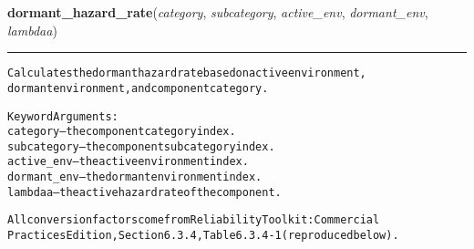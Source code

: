 \begin{boxedminipage}{\funcwidth}
\setlength{\parskip}{1ex}
    \end{boxedminipage}

    \label{reliafree:calculations:dormant_hazard_rate}

    \vspace{0.5ex}

\hspace{.8\funcindent}\begin{boxedminipage}{\funcwidth}

    \raggedright \textbf{dormant\_hazard\_rate}(\textit{category}, \textit{subcategory}, \textit{active\_env}, \textit{dormant\_env}, \textit{lambdaa})

    \vspace{-1.5ex}

    \rule{\textwidth}{0.5\fboxrule}
\setlength{\parskip}{2ex}
\begin{alltt}
Calculates the dormant hazard rate based on active environment,
dormant environment, and component category.

Keyword Arguments:
category    -- the component category index.
subcategory -- the component subcategory index.
active\_env  -- the active environment index.
dormant\_env -- the dormant environment index.
lambdaa     -- the active hazard rate of the component.

All conversion factors come from Reliability Toolkit: Commercial
Practices Edition, Section 6.3.4, Table 6.3.4-1 (reproduced below).


\end{alltt}
\end{boxedminipage}
